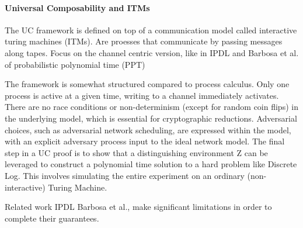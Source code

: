 \paragraph{Universal Composability and ITMs}
The UC framework is defined on top of a communication model called interactive turing machines (ITMs).
Are proesses that communicate by passing messages along tapes. Focus on the channel centric version, like in IPDL and Barbosa et al.
of probabilistic polynomial time (PPT)

The framework is somewhat structured compared to process calculus. Only one process is active at a given time, writing to a channel immediately activates. There are no race conditions or non-determinism (except for random coin flips) in the underlying model, which is essential for cryptographic reductions.
Adversarial choices, such as adversarial network scheduling, are expressed within the model, with an explicit adversary process input to the ideal network model.
The final step in a UC proof is to show that a distinguishing environment Z can be leveraged to construct a polynomial time solution to a hard problem like Discrete Log. This involves simulating the entire  experiment on an ordinary (non-interactive) Turing Machine.

Related work IPDL Barbosa et al., make significant limitations in order to complete their guarantees.


  

